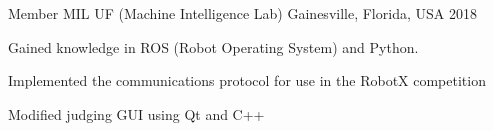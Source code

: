 

\begin{cventries}

  \cventry
    {Member} %
    {MIL UF (Machine Intelligence Lab)} %
    {Gainesville, Florida, USA} %
    {2018} %
    {
      \begin{cvitems} %
        \item {Gained knowledge in ROS (Robot Operating System) and Python.}
        \item {Implemented the communications protocol for use in the RobotX competition}
        \item {Modified judging GUI using Qt and C++}
      \end{cvitems}
    }

\end{cventries}
